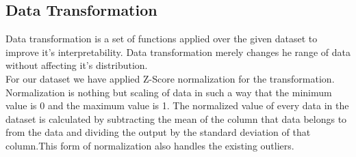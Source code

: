\documentclass[fleqn,10pt]{SelfArx} %
\begin{document}
\subsection{Data Transformation}

Data transformation is a set of functions applied over the given dataset to improve it’s interpretability. Data transformation merely changes he range of data without affecting it’s distribution. \\

For our dataset we have applied Z-Score normalization for the transformation. Normalization is nothing but scaling  of data in such a way that the minimum value is 0 and the maximum value is 1. The normalized value of every data in the dataset is calculated by subtracting the mean of the column that data  belongs to from the data and dividing the output by  the standard deviation of that column.This form of normalization also handles the existing outliers.
\end{document}
